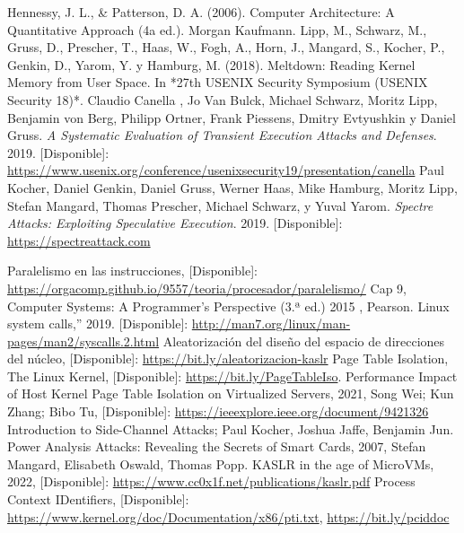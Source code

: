 \documentclass[lettersize,compsoc]{IEEEtran}
\begin{document}
\begin{thebibliography}{2}

 Hennessy, J. L., & Patterson, D. A. (2006). Computer Architecture: A Quantitative Approach (4a ed.). Morgan Kaufmann.
 Lipp, M., Schwarz, M., Gruss, D., Prescher, T., Haas, W., Fogh, A., Horn, J., Mangard, S., Kocher, P., Genkin, D., Yarom, Y. y Hamburg, M. (2018). Meltdown: Reading Kernel Memory from User Space. In *27th USENIX Security Symposium (USENIX Security 18)*.
 Claudio Canella , Jo Van Bulck, Michael Schwarz, Moritz Lipp, Benjamin von Berg, Philipp Ortner, Frank Piessens, Dmitry Evtyushkin y Daniel Gruss. \textit{A Systematic Evaluation of Transient Execution Attacks and Defenses}. 2019. [Disponible]: \url{https://www.usenix.org/conference/usenixsecurity19/presentation/canella}
 Paul Kocher, Daniel Genkin, Daniel Gruss, Werner Haas, Mike Hamburg, Moritz Lipp, Stefan Mangard, Thomas Prescher, Michael Schwarz, y Yuval Yarom. \textit{Spectre Attacks: Exploiting Speculative Execution}. 2019. [Disponible]: \url{https://spectreattack.com}

 Paralelismo en las instrucciones, [Disponible]: \url{https://orgacomp.github.io/9557/teoria/procesador/paralelismo/}
 Cap 9, Computer Systems: A Programmer’s Perspective (3.ª ed.) 2015 , Pearson.
  Linux system calls,” 2019. [Disponible]: \url{http://man7.org/linux/man-pages/man2/syscalls.2.html} 
 Aleatorización del diseño del espacio de direcciones del núcleo, [Disponible]: \url{https://bit.ly/aleatorizacion-kaslr}
 Page Table Isolation, The Linux Kernel, [Disponible]: \url{https://bit.ly/PageTableIso}.
 Performance Impact of Host Kernel Page Table Isolation on Virtualized Servers, 2021, Song Wei; Kun Zhang; Bibo Tu, [Disponible]: \url{https://ieeexplore.ieee.org/document/9421326}
 Introduction to Side-Channel Attacks; Paul Kocher, Joshua Jaffe, Benjamin Jun.
 Power Analysis Attacks: Revealing the Secrets of Smart Cards, 2007,  Stefan Mangard, Elisabeth Oswald, Thomas Popp.
 KASLR in the age of MicroVMs, 2022, [Disponible]: \url{https://www.cc0x1f.net/publications/kaslr.pdf}
 Process Context IDentifiers, [Disponible]: \url{https://www.kernel.org/doc/Documentation/x86/pti.txt}, \url{https://bit.ly/pciddoc}


\end{thebibliography}
\end{document}
